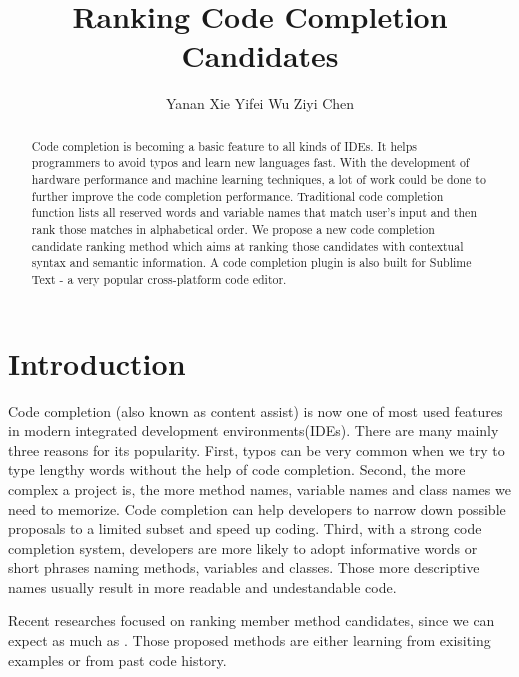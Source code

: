 \documentclass[prodmode,acmtecs]{acmsmall} %
\begin{document}

\title{Ranking Code Completion Candidates}
\author{Yanan Xie
Yifei Wu
Ziyi Chen
}
\begin{abstract}
Code completion is becoming a basic feature to all kinds of IDEs. It helps programmers to avoid typos and learn new languages fast. With the development of hardware performance and machine learning techniques, a lot of work could be done to further improve the code completion performance. Traditional code completion function lists all reserved words and variable names that match user’s input and then rank those matches in alphabetical order. We propose a new code completion candidate ranking method which aims at ranking those candidates with contextual syntax and semantic information. A code completion plugin is also built for Sublime Text - a very popular cross-platform code editor.
\end{abstract}


\maketitle


\section{Introduction}

Code completion (also known as content assist) is now one of most used features in modern integrated development environments(IDEs)\cite{murphy2006java}. There are many mainly three reasons for its popularity. First, typos can be very common when we try to type lengthy words without the help of code completion. Second, the more complex a project is, the more method names, variable names and class names we need to memorize. Code completion can help developers to narrow down possible proposals to a limited subset and speed up coding. Third, with a strong code completion system, developers are more likely to adopt informative words or short phrases naming methods, variables and classes. Those more descriptive names usually result in more readable and undestandable code\cite{bruch2009learning}. 

Recent researches focused on ranking member method candidates, since we can expect as much as . Those proposed methods are either learning from exisiting examples\cite{bruch2009learning,raychev2014code} or from past code history\cite{robbes2008program}. 
\end{document}
